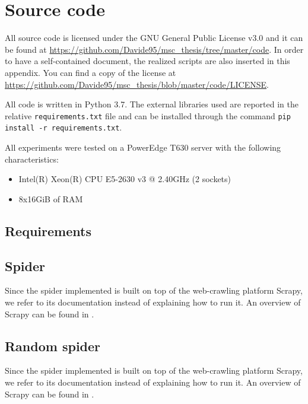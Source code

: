 \chapter{Source code}
All source code is licensed under the GNU General Public License v3.0 and it can be found at \url{https://github.com/Davide95/msc_thesis/tree/master/code}.
In order to have a self-contained document, the realized scripts are also inserted in this appendix.
You can find a copy of the license at \url{https://github.com/Davide95/msc_thesis/blob/master/code/LICENSE}.

All code is written in Python 3.7. The external libraries used are reported in the relative \texttt{requirements.txt} file and can be installed through the command \texttt{pip install -r requirements.txt}.

All experiments were tested on a PowerEdge T630 server with the following characteristics:
\begin{itemize}
    \item Intel(R) Xeon(R) CPU E5-2630 v3 @ 2.40GHz (2 sockets)
    \item 8x16GiB of RAM
\end{itemize}

\section{Requirements}
\begin{minipage}{\linewidth}
    
\end{minipage}

\pagebreak
\section{Spider} \label{spider}

Since the spider implemented is built on top of the web-crawling platform Scrapy, we refer to its documentation instead of explaining how to run it.
An overview of Scrapy can be found in \cite{kouzis2016learning}.



\section{Random spider} \label{spider}

Since the spider implemented is built on top of the web-crawling platform Scrapy, we refer to its documentation instead of explaining how to run it.
An overview of Scrapy can be found in \cite{kouzis2016learning}.

